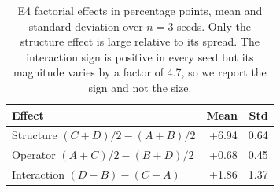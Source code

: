 \begin{table}[tbp]
\centering
\caption{E4 factorial effects in percentage points, mean and standard deviation over $n=3$ seeds. Only the structure effect is large relative to its spread. The interaction sign is positive in every seed but its magnitude varies by a factor of 4.7, so we report the sign and not the size.}
\label{tab:e4effects}
\begin{tabular}{lrr}
\toprule
Effect & Mean & Std \\
\midrule
Structure $(C{+}D)/2-(A{+}B)/2$ & +6.94 & 0.64 \\
Operator $(A{+}C)/2-(B{+}D)/2$ & +0.68 & 0.45 \\
Interaction $(D{-}B)-(C{-}A)$ & +1.86 & 1.37 \\
\bottomrule
\end{tabular}
\end{table}
